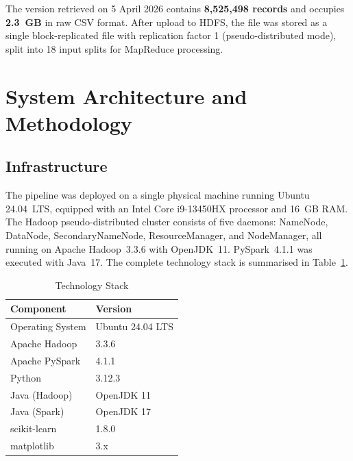 \documentclass[conference]{IEEEtran}
\begin{document}
The version retrieved on 5 April 2026 contains \textbf{8,525,498 records} and
occupies \textbf{2.3~GB} in raw CSV format. After upload to HDFS, the file was
stored as a single block-replicated file with replication factor 1 (pseudo-distributed
mode), split into 18 input splits for MapReduce processing.

\section{System Architecture and Methodology}

\subsection{Infrastructure}

The pipeline was deployed on a single physical machine running Ubuntu 24.04~LTS,
equipped with an Intel Core i9-13450HX processor and 16~GB RAM. The Hadoop
pseudo-distributed cluster consists of five daemons: NameNode, DataNode,
SecondaryNameNode, ResourceManager, and NodeManager, all running on
Apache Hadoop~3.3.6 with OpenJDK~11. PySpark~4.1.1 was executed with Java~17.
The complete technology stack is summarised in Table~\ref{tab:stack}.

\begin{table}[h]
\caption{Technology Stack}
\label{tab:stack}
\centering
\begin{tabular}{ll}
\toprule
\textbf{Component} & \textbf{Version} \\
\midrule
Operating System   & Ubuntu 24.04 LTS \\
Apache Hadoop      & 3.3.6 \\
Apache PySpark     & 4.1.1 \\
Python             & 3.12.3 \\
Java (Hadoop)      & OpenJDK 11 \\
Java (Spark)       & OpenJDK 17 \\
scikit-learn       & 1.8.0 \\
matplotlib         & 3.x \\
\bottomrule
\end{tabular}
\end{table}
\end{document}
